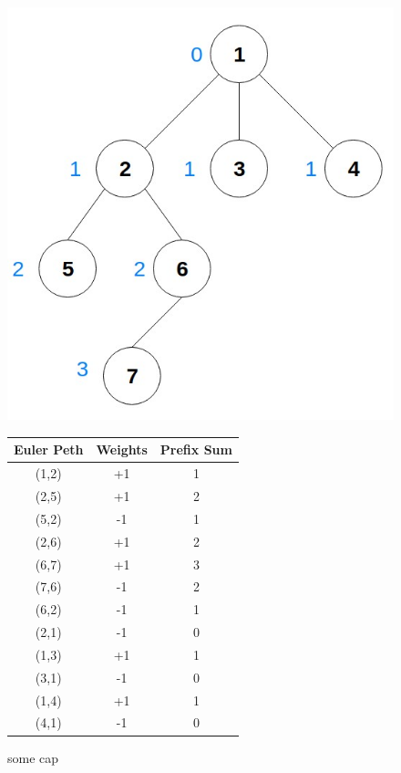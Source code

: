\documentclass[twoside]{article}
\begin{document}
\begin{figure}[!h]
\centering
\begin{minipage}{.5\textwidth}
  \centering
  \includegraphics[scale=.3]{g4}
  \caption{Tree rooted at 1} 
  \label{fig:test1}
\end{minipage}%
\centering
\begin{minipage}{.5\textwidth}
  \centering
  \begin{center}
  \begin{tabular}{||c c c||} 
  \hline
     Euler Peth & Weights & Prefix Sum \\
  \hline
     (1,2) & {+1} & {1} \\
  \hline
  	 (2,5) & {+1} & {2} \\
  \hline
 	 (5,2) & {-1} & {1} \\
  \hline
 	 (2,6) & {+1} & {2} \\
  \hline
 	 (6,7) & {+1} & {3} \\
  \hline
 	 (7,6) & {-1} & {2} \\
  \hline
 	 (6,2) & {-1} & {1} \\
  \hline
 	 (2,1) & {-1} & {0} \\
  \hline
 	 (1,3) & {+1} & {1} \\
  \hline
 	 (3,1) & {-1} & {0} \\
  \hline
 	 (1,4) & {+1} & {1} \\
  \hline
 	 (4,1) & {-1} & {0} \\
  \hline
  \end{tabular}
  \end{center}
  \caption{some cap}
\label{fig:test1}
\end{minipage}%
\end{figure}
\end{document}
